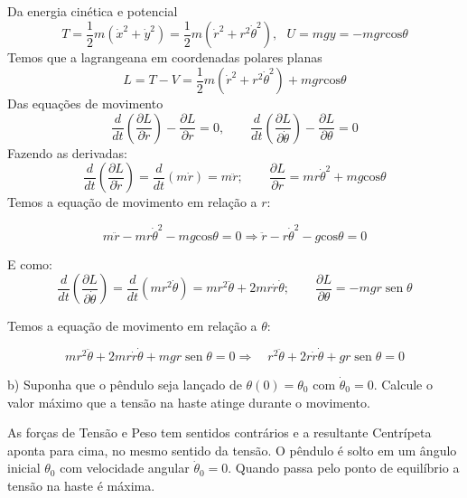 \begin{enumerate}[start=1,label={\bfseries Q\arabic*.}]
Da energia cinética e potencial
$$
T = \frac{1}{2}m (\dot{x}^{2} + \dot{y}^{2}) = \frac{1}{2}m ( \dot{r}^{2} + r^{2} \dot{\theta}^{2} ), \ \ \
U = mgy = - mgr \mathrm{cos}\theta
$$
%
Temos que a lagrangeana em coordenadas polares planas
%
$$
L = T - V = \frac{1}{2} m ( \dot{r}^{2} + r^{2} \dot{\theta}^{2} ) + mgr \mathrm{cos}\theta
$$
%
Das equações de movimento
%
$$
\frac{d}{dt} \left( \frac{\partial L }{ \partial \dot{r} }  \right) - \frac{ \partial L }{\partial r} = 0, \quad \quad
\frac{d}{dt} \left( \frac{\partial L }{ \partial \dot{\theta} }  \right) - \frac{ \partial L }{\partial \theta} = 0
$$
Fazendo as derivadas:
$$
\frac{d}{dt} \left( \frac{\partial L }{ \partial \dot{r} }  \right) = \frac{d}{d t} (m \dot{r}) = m \ddot{r}; \quad \quad
\frac{\partial L}{\partial r} = mr \dot{\theta}^{2} + mg \mathrm{cos}\theta
$$
Temos a equação de movimento em relação a $r$:

\begin{equation} \label{eq:acel-centrip}
m \ddot{r} - mr \dot{\theta}^{2} - mg\mathrm{cos} \theta = 0 \Rightarrow \boxed{\ddot{r} - r \dot{\theta}^{2} - g \mathrm{cos}\theta  = 0}
\end{equation}

E como:
$$
\frac{d}{dt} \left( \frac{\partial L}{\partial \dot{\theta} } \right) = \frac{d}{dt} (mr^{2} \dot{\theta})  = mr^{2} \ddot{\theta} + 2mr \dot{r} \dot{\theta}; \quad \quad \frac{\partial L}{\partial \theta} = - mgr \operatorname{sen}\theta
$$

Temos a equação de movimento em relação a $\theta$:

$$
mr^{2} \ddot{\theta} + 2mr \dot{r} \dot{\theta} + mgr \operatorname{sen} \theta = 0 \Rightarrow \quad  \boxed{ r^{2} \ddot{\theta} + 2r\dot{r} \dot{\theta} + gr \operatorname{sen} \theta = 0}
$$




b) Suponha que o pêndulo seja lançado de $\theta(0) = \theta_{0}$ com $\dot{\theta}_{0} = 0$. Calcule o valor máximo que a tensão na haste atinge durante o movimento.

\resposta As forças de Tensão e Peso tem sentidos contrários e a resultante Centrípeta aponta para cima, no mesmo sentido da tensão. O pêndulo é solto em um ângulo inicial $\theta_{0}$ com velocidade angular $\dot{\theta}_{0} = 0$. Quando passa pelo ponto de equilíbrio a tensão na haste é máxima. 


\end{enumerate}
